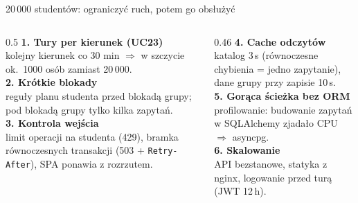 \documentclass[aspectratio=169,11pt]{beamer}
\begin{document}
\begin{frame}{20\,000 studentów: ograniczyć ruch, potem go obsłużyć}
  \begin{columns}[T]
    \begin{column}{0.5\textwidth}
      \small
      \textbf{1. Tury per kierunek (UC23)}\\
      kolejny kierunek co 30 min $\Rightarrow$ w szczycie ok.\ 1000 osób zamiast 20\,000.\\[6pt]
      \textbf{2. Krótkie blokady}\\
      reguły planu studenta przed blokadą grupy; pod blokadą grupy tylko kilka zapytań.\\[6pt]
      \textbf{3. Kontrola wejścia}\\
      limit operacji na studenta (429), bramka równoczesnych transakcji (503 + \texttt{Retry-After}), SPA ponawia z rozrzutem.
    \end{column}
    \begin{column}{0.46\textwidth}
      \small
      \textbf{4. Cache odczytów}\\
      katalog 3\,s (równoczesne chybienia = jedno zapytanie), dane grupy przy zapisie 10\,s.\\[6pt]
      \textbf{5. Gorąca ścieżka bez ORM}\\
      profilowanie: budowanie zapytań w SQLAlchemy zjadało CPU $\Rightarrow$ asyncpg.\\[6pt]
      \textbf{6. Skalowanie}\\
      API bezstanowe, statyka z nginx, logowanie przed turą (JWT 12\,h).
    \end{column}
  \end{columns}
\end{frame}
\end{document}
